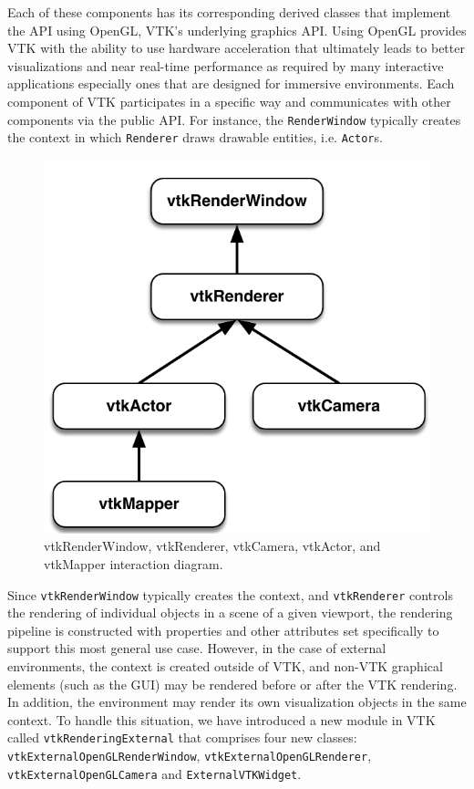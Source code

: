 Each of these components has its corresponding derived classes that implement the API using OpenGL, VTK's underlying graphics API.
Using OpenGL provides VTK with the ability to use hardware acceleration that ultimately leads to better visualizations and near real-time performance as required by many interactive applications especially ones that are designed for immersive environments.
Each component of VTK participates in a specific way and communicates with other components via the public API.
For instance, the \texttt{RenderWindow} typically creates the context in which
\texttt{Renderer} draws drawable entities, i.e. \texttt{Actor}s.

\begin{figure}[h!]
  \centering
  \includegraphics[scale=0.5]{images/vtkRenderPipeline.pdf}
  \caption{vtkRenderWindow, vtkRenderer, vtkCamera, vtkActor, and vtkMapper interaction diagram.}
  \label{fig:vtkRenderPipeline}
\end{figure}

Since \texttt{vtkRenderWindow} typically creates the context, and \texttt{vtkRenderer} controls the rendering of individual objects in a scene of a given viewport, the rendering pipeline is constructed with properties and other attributes set specifically to support this most general use case.
However, in the case of external environments, the context is created outside of VTK, and non-VTK graphical elements (such as the GUI) may be rendered before or after the VTK rendering.
In addition, the environment may render its own visualization objects in the same context.
To handle this situation, we have introduced a new module in VTK called \texttt{vtkRenderingExternal} that comprises four new classes: \texttt{vtkExternalOpenGLRenderWindow}, \texttt{vtkExternalOpenGLRenderer}, \texttt{vtkExternalOpenGLCamera} and \texttt{ExternalVTKWidget}. 

